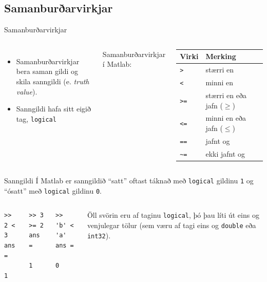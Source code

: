 \documentclass[handout]{beamer}
\begin{document}
\subsection{Samanburðarvirkjar}
\begin{frame}{Samanburðarvirkjar}
\begin{columns}
\begin{itemize}
 \item Samanburðarvirkjar bera saman gildi og skila sanngildi (e. \emph{truth value}).
 \item Sanngildi hafa sitt eigið tag, \texttt{logical}\footnotemark
\end{itemize}

\vspace{0.5cm}
Samanburðarvirkjar í Matlab: 

\vspace{0.2cm}
\begin{tabular}{ll}
\toprule
Virki&Merking\\
\midrule
\texttt{>}&stærri en\\
\texttt{<}&minni en\\
\texttt{>=}&stærri en eða jafn ($\geq$)\\
\texttt{<=}&minni en eða jafn ($\leq$)\\
\texttt{==}&jafnt og\\
\texttt{\~}\texttt{=}&ekki jafnt og\\
\bottomrule
\end{tabular}
\end{columns}
\end{frame}

\begin{frame}[fragile]{Sanngildi}
Í Matlab er sanngildið ``satt'' oftast táknað með \texttt{logical} gildinu \texttt{1} og ``ósatt'' með \texttt{logical} gildinu \texttt{0}.
\begin{columns}
\begin{verbatim}
>> 2 < 3
ans =
     1
\end{verbatim}
\begin{verbatim}
>> 3 >= 2
ans =
     1
\end{verbatim}
\begin{verbatim}
>> 'b' < 'a'
ans =
     0
\end{verbatim}

\vspace{0.09cm}
Öll svörin eru af taginu \texttt{logical}, þó þau líti út eins og venjulegar tölur (sem væru af tagi eins og \texttt{double} eða \texttt{int32}).
\end{columns}
\end{frame}
\end{document}
